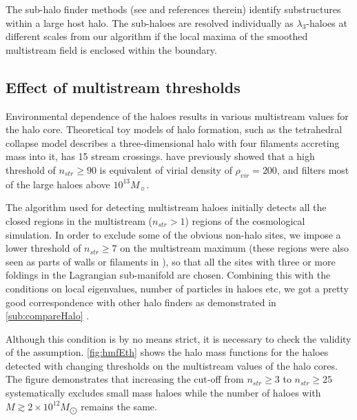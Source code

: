 \documentclass[fleqn,usenatbib,useAMS]{mnras}
\begin{document}
{The sub-halo finder methods (see \citealt{Onions2012} and references therein) identify substructures within a large host halo. The sub-haloes are resolved individually as $\lambda_3$-haloes at different scales from our algorithm if the local maxima of the smoothed multistream field is enclosed within the boundary.  




\subsection{Effect of multistream thresholds}
\label{sub:multiThresholds}


Environmental dependence of the haloes results in various multistream values for the halo core. Theoretical toy models of halo formation, such as the tetrahedral collapse model \cite{Neyrinck2016} describes a three-dimensional halo with four filaments accreting mass into it, has 15 stream crossings.  
\cite{Ramachandra2015} have previously showed that a high threshold of $n_{str} \geq 90$ is equivalent of virial density of $\rho_{vir} = 200$, and filters most of the large haloes above $10^{13} M_{\sun}$. 

The algorithm used for detecting multistream haloes initially detects all the closed regions in the multistream ($n_{str} > 1$) regions of the cosmological simulation. In order to exclude some of the obvious non-halo sites, we impose a lower threshold of $n_{str} \geq 7$ on the multistream maximum (these regions were also seen as parts of walls or filaments in \citealt{Ramachandra2015} ), so that all the sites with three or more foldings in the Lagrangian sub-manifold are chosen. Combining this with the conditions on local eigenvalues, number of particles in haloes etc, we got a pretty good correspondence with other halo finders as demonstrated in \autoref{sub:compareHalo} . 

Although this condition is by no means strict, it is necessary to check the validity of the assumption. \autoref{fig:hmfEth} shows the halo mass functions for the haloes detected with changing thresholds on the multistream values of the halo cores. The figure demonstrates that increasing the cut-off from $n_{str} \geq 3$ to $n_{str} \geq 25$ systematically excludes small mass
haloes while the number of haloes with $M  \gtrsim 2\times10^{12} M_{\bigodot}$  remains the same.}

 
\end{document}
